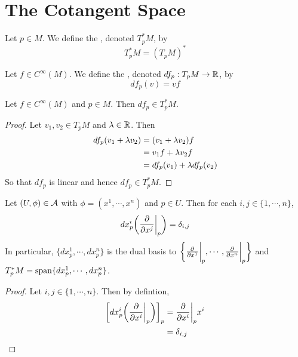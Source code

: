 \documentclass{book}
\begin{document}
	
	
	
	
	
	
	
	
	
	
	
	
	
	
	\newpage
	\section{The Cotangent Space}	
	
	
	\begin{defn}
	Let $p \in M$. We define the , denoted $T^*_pM$, by $$T^*_pM = (T_pM)^*$$
	\end{defn}
	
	\begin{defn}
	Let $f \in C^{\infty}(M)$. We define the , denoted $df_p:T_pM \rightarrow \mathbb{R}$, by $$df_p(v) = vf$$
	\end{defn}
	
	\begin{ex}
	Let $f \in C^{\infty}(M)$ and $p \in M$. Then $df_p \in T^*_pM$.
	\end{ex}
	
	\begin{proof}
	Let $v_1, v_2 \in T_pM$ and $\lambda \in \mathbb{R}$. Then 
	\begin{align*}
	df_p(v_1 + \lambda v_2) 
	&= (v_1 + \lambda v_2) f \\
	&= v_1 f + \lambda v_2 f \\
	&= df_p(v_1) + \lambda df_p(v_2)
	\end{align*}
	So that $df_p$ is linear and hence $df_p \in T^*_pM$.
	\end{proof}
	
	\begin{ex}
		Let $(U, \phi) \in \mathcal{A}$ with $\phi = (x^1, \cdots, x^n)$ and $p \in U$. Then for each $i,j \in \{1, \cdots, n\}$, $$dx^i_p \bigg(\frac{\partial }{\partial x^j} \bigg|_p \bigg) = \delta_{i,j}$$ 
		In particular, $\{dx^1_p, \cdots, dx^n_p \}$ is the dual basis to $\bigg \{ \frac{\partial}{\partial x^1} \bigg|_p, \cdots, \frac{\partial}{\partial x^n} \bigg|_p \bigg \}$ and $T_p^*M = \operatorname{span}\{dx^1_p, \cdots, dx^n_p\}$.
	\end{ex}

	\begin{proof}
		Let $i,j \in \{1, \cdots, n\}$. Then  by defintion,
		\begin{align*}
			\bigg[ dx^i_p \bigg (\frac{\partial}{\partial x^i} \bigg|_p \bigg ) \bigg]_p 
			&= \frac{\partial}{\partial x^i} \bigg|_p x^i \\
			&= \delta_{i,j} \\
		\end{align*}
	\end{proof}
	
\end{document}
